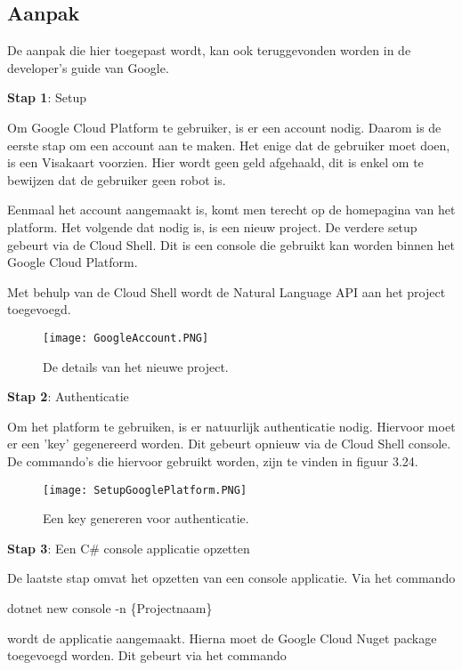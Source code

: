 \subsection{Aanpak}
\label{aanpakgoogleplatform}

De aanpak die hier toegepast wordt, kan ook teruggevonden worden in de developer's guide van Google. \autocite{Codelabs2021}

\textbf{Stap 1}: Setup

Om Google Cloud Platform te gebruiker, is er een account nodig. Daarom is de eerste stap om een account aan te maken. Het enige dat de gebruiker moet doen, is een Visakaart voorzien. Hier wordt geen geld afgehaald, dit is enkel om te bewijzen dat de gebruiker geen robot is. 

Eenmaal het account aangemaakt is, komt men terecht op de homepagina van het platform. Het volgende dat nodig is, is een nieuw project. De verdere setup gebeurt via de Cloud Shell. Dit is een console die gebruikt kan worden binnen het Google Cloud Platform. 

Met behulp van de Cloud Shell wordt de Natural Language API aan het project toegevoegd. 

\begin{figure}[!htbp]
    \texttt{[image: GoogleAccount.PNG]}
    \caption{\label{googleaccount}De details van het nieuwe project.}
\end{figure}
\FloatBarrier 

\textbf{Stap 2}: Authenticatie

Om het platform te gebruiken, is er natuurlijk authenticatie nodig. Hiervoor moet er een 'key' gegenereerd worden. Dit gebeurt opnieuw via de Cloud Shell console. De commando's die hiervoor gebruikt worden, zijn te vinden in figuur 3.24.

\begin{figure}[!htbp]
    \texttt{[image: SetupGooglePlatform.PNG]}
    \caption{\label{setupgoogleplatform}Een key genereren voor authenticatie.}
\end{figure}
\FloatBarrier 

\textbf{Stap 3}: Een C\# console applicatie opzetten

De laatste stap omvat het opzetten van een console applicatie. Via het commando 

dotnet new console -n \{Projectnaam\} 

wordt de applicatie aangemaakt. Hierna moet de Google Cloud Nuget package toegevoegd worden. Dit gebeurt via het commando


